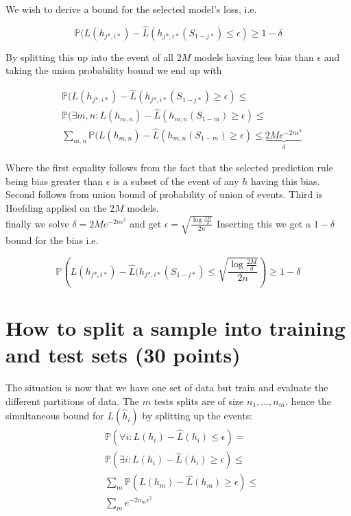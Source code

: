 \documentclass[a4paper,12pt]{article}
\begin{document}
We wish to derive a bound for the selected model's loss, i.e. 

$$
\mathbb{P}(L(h_{j*,i*}) - \hat{L}(h_{j*,i*}(S_{1-j*}) \leq \epsilon) \geq 1-\delta
$$

By splitting this up into the event of all $2M$ models having less bias than $\epsilon$ and taking the union probability bound we end up with 


\begin{align*}
&\mathbb{P}(L(h_{j*,i*}) - \hat{L}(h_{j*,i*}(S_{1-j*}) \geq \epsilon)  \leq \\
&\mathbb{P}(\exists m,n : L(h_{m,n}) - \hat{L}(h_{m,n}(S_{1-m}) \geq \epsilon) \leq \\
& \sum_{m,n} \mathbb{P}(L(h_{m,n}) - \hat{L}(h_{m,n}(S_{1-m}) \geq \epsilon) \leq
\underbrace{2Me^{-2n\epsilon^2}}_{\delta}
\end{align*}

Where the first equality follows from the fact that the selected prediction rule being bias greater than $\epsilon$ is a subset of the event of any $h$ having this bias.
Second follows from union bound of probability of union of events. Third is Hoefding applied on the $2M$ models.\\
finally we solve $\delta = 2Me^{-2n\epsilon^2}$ and get 
$\epsilon = 
\sqrt{ 
	\frac{\log\frac{2M}{\delta}}{2n}
	}
$
Inserting this we get a $1-\delta$ bound for the bias i.e.

$$
\mathbb{P}\left(L(h_{j*,i*}) - \hat{L}(h_{j*,i*}(S_{1-j*}) \leq \sqrt{ \frac{\log\frac{2M}{\delta}}{2n}}\right) \geq 1-\delta
$$



\section{How to split a sample into training and test sets (30 points)}
The situation is now that we have one set of data but train and evaluate the different partitions of data. The $m$ tests splits are of size $n_1,\dots,n_m$, hence the simultaneous bound for $L(\hat{h}_i)$ by splitting up the events:
\begin{align*}
&\mathbb{P}(\forall i: L(h_i) - \hat{L}(h_i) \leq \epsilon )  = \\
&\mathbb{P} (\exists i: L(h_i) - \hat{L}(h_i) \geq \epsilon)  \leq \\
&\sum_m \mathbb{P} ( L(h_m) - \hat{L}(h_m) \geq \epsilon)  \leq \\
&\sum_m e^{-2n_m\epsilon^2}
\end{align*}
\end{document}
